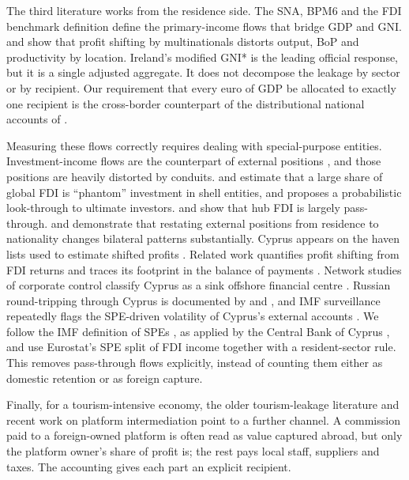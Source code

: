 The third literature works from the residence side.
The SNA, BPM6 and the FDI benchmark definition \citep{UN2009SNA,IMF2009BPM6,OECD2008BMD} define the primary-income flows that bridge GDP and GNI.
\citet{Rassier2017} and \citet{Guvenenetal2022} show that profit shifting by multinationals distorts output, BoP and productivity by location.
Ireland's modified GNI* \citep{ESRG2016,FitzGerald2018} is the leading official response, but it is a single adjusted aggregate.
It does not decompose the leakage by sector or by recipient.
Our requirement that every euro of GDP be allocated to exactly one recipient is the cross-border counterpart of the distributional national accounts of \citet{PikettySaezZucman2018}.

Measuring these flows correctly requires dealing with special-purpose entities.
Investment-income flows are the counterpart of external positions \citep{LaneMilesiFerretti2018}, and those positions are heavily distorted by conduits.
\citet{DamgaardElkjaer2017} and \citet{DamgaardElkjaerJohannesen2024} estimate that a large share of global FDI is ``phantom'' investment in shell entities, and \citet{Casella2019} proposes a probabilistic look-through to ultimate investors.
\citet{BlanchardAcalin2016} and \citet{BolwijnCasellaRigo2018} show that hub FDI is largely pass-through.
\citet{Zucman2013} and \citet{Coppolaetal2021} demonstrate that restating external positions from residence to nationality changes bilateral patterns substantially.
Cyprus appears on the haven lists used to estimate shifted profits \citep{HinesRice1994,TorslovWierZucman2023}.
Related work quantifies profit shifting from FDI returns \citep{JanskyPalansky2019} and traces its footprint in the balance of payments \citep{HebousKlemmWu2021}.
Network studies of corporate control \citep{Vitalietal2011} classify Cyprus as a sink offshore financial centre \citep{GarciaBernardoetal2017}.
Russian round-tripping through Cyprus is documented by \citet{Ledyaevaetal2015} and \citet{RepousisLoisKougioumtsidis2019}, and IMF surveillance repeatedly flags the SPE-driven volatility of Cyprus's external accounts \citep{IMF2023CyprusSI,IMF2024Cyprus}.
We follow the IMF definition of SPEs \citep{SanchezMunozetal2022}, as applied by the Central Bank of Cyprus \citep{CBC2026External}, and use Eurostat's SPE split of FDI income together with a resident-sector rule.
This removes pass-through flows explicitly, instead of counting them either as domestic retention or as foreign capture.

Finally, for a tourism-intensive economy, the older tourism-leakage literature \citep{Sinclair1998} and recent work on platform intermediation \citep{RochetTirole2003,Hunoldetal2020,UNCTAD2019DER} point to a further channel.
A commission paid to a foreign-owned platform is often read as value captured abroad, but only the platform owner's share of profit is; the rest pays local staff, suppliers and taxes.
The accounting gives each part an explicit recipient.

